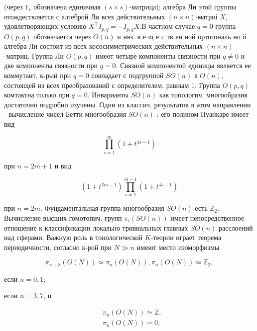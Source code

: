 \documentclass[10pt]{article}
\begin{document}
(через $1_{s}$ обозначена единичная $(s \times s)$-матрица); алгебра Ли этой группы отождествляется с алгеброй Ли всех действительных $(n \times n)$-матриі $X$, удовлетворяющих условию $X^{\top} I_{p, q}=-I_{p, q} X$.В частном случае $q=0$ группа $O(p, q)$ обозначается через $O(n)$ и няз. в е щ е с тв ен ной ортогональ но й алгебра Ли состоит из всех кососимметрических действительных $(n \times n)$-матриц. Группа Ли $O(p, q)$ имеөт четыре компоненты связности при $q \neq 0$ и две компоненты связности при $q=0$. Связной компонентой единицы является ее коммутант, к-рыӥ при $q=0$ совпадает с подгруппой $S O(n)$ в $O(n)$, состоящей из всех преобразований с определителем, равным 1. Группа $O(p, q)$ комтактна только при $q=0$. Инварианты $S O(n)$ как топологич. многообразия достаточно подробно изучены. Один из классич. результатов в әтом направлении - вычисление чисел Бетти многообразия $S O(n)$ : его полином Пуанкаре имеет вид



\[

\prod_{s=1}^{m}\left(1+t^{4 s-1}\right)

\]



при $n=2 m+1$ и вид



\[

\left(1+t^{2 m-1}\right) \prod_{s=1}^{m-1}\left(1+t^{4 s-1}\right)

\]



при $n=2 m$. Фундаментальная группа многообразия $S O(n)$ есть $\mathbb{Z}_{2}$. Вычисление высших гомотопич. групп $\pi_{l}(S O(n))$ имеет непосредственное отношение к классификации локально тривиальных главных $S O(n)$ расслоений над сферами. Важную роль в тонологической $K$-теории играет теорема периодичности, согласно к-рой при $N \gg n$ имеют место изоморфизмы



\[

\pi_{n+8}(O(N)) \simeq \pi_{n}(O(N)), \pi_{n}(O(N)) \simeq \mathbb{Z}_{2},

\]



если $n=0,1$;



если $n=3,7$, п



\[

\begin{aligned}

& \pi_{n}(O(N)) \simeq \mathbb{Z}, \\

& \pi_{n}(O(N))=0,

\end{aligned}

\]
\end{document}
